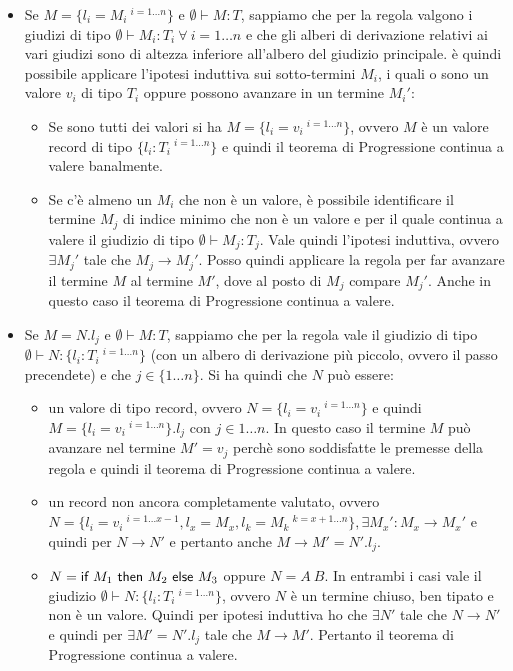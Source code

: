 \begin{itemize}
	\item {} Se $M = \{ l_i = M_i \:^{i = 1 \ldots n} \}$ e $\emptyset \vdash M : T$, sappiamo che per la regola  valgono i giudizi di tipo $\emptyset \vdash M_i : T_i \: \forall \: i = 1\ldots n$ e che gli alberi di derivazione relativi ai vari giudizi sono di altezza inferiore all'albero del giudizio principale.
	\`e quindi possibile applicare l'ipotesi induttiva sui sotto-termini $M_i$, i quali o sono un valore $v_i$ di tipo $T_i$ oppure possono avanzare in un termine $M_i'$:
	\begin{itemize}
		\item Se sono tutti dei valori si ha $M = \{ l_i = v_i \:^{i = 1 \ldots n} \}$, ovvero $M$ \`e un valore record di tipo $\{ l_i : T_i \:^{i = 1 \ldots n} \}$ e quindi il teorema di Progressione continua a valere banalmente.
		\item Se c'\`e almeno un $M_i$ che non \`e un valore, \`e possibile identificare il termine $M_j$ di indice minimo che non \`e un valore e per il quale continua a valere il giudizio di tipo $\emptyset \vdash M_j : T_j$. Vale quindi l'ipotesi induttiva, ovvero $\exists M_j'$ tale che $M_j \to M_j'$. Posso quindi applicare la regola  per far avanzare il termine $M$ al termine $M'$, dove al posto di $M_j$ compare $M_j'$. Anche in questo caso il teorema di Progressione continua a valere.
	\end{itemize}
	\item {} Se $M = N.l_j$ e $\emptyset \vdash M : T$, sappiamo che per la regola  vale il giudizio di tipo $\emptyset \vdash N : \{ l_i : T_i \:^{i = 1 \ldots n}\}$ (con un albero di derivazione pi\`u piccolo, ovvero il passo precendete) e che $j \in \{1 \ldots n\}$.
	Si ha quindi che $N$ pu\`o essere:
	\begin{itemize}
		\item un valore di tipo record, ovvero $N = \{ l_i = v_i \:^{i = 1 \ldots n} \}$ e quindi $M = \{ l_i = v_i \:^{i = 1 \ldots n} \}.l_j$ con $j \in 1 \ldots n$. In questo caso il termine $M$ pu\`o avanzare nel termine $M' = v_j$ perch\`e sono soddisfatte le premesse della regola  e quindi il teorema di Progressione continua a valere.
		
		\item un record non ancora completamente valutato, ovvero $N = \{ l_i = v_i \:^{i = 1 \ldots x-1}, l_x = M_x, l_k = M_k \:^{k = x+1\ldots n}\}, \exists M_x': M_x \to M_x'$ e quindi per  $N \to N'$ e pertanto anche $M \to M' = N'.l_j$.
		
		\item $N = \IF{M_1}{M_2}{M_3}$ oppure $N = A \: B$. In entrambi i casi vale il giudizio $\emptyset \vdash N : \{ l_i : T_i \:^{i = 1 \ldots n}\}$, ovvero $N$ \`e un termine chiuso, ben tipato e non \`e un valore. 
		Quindi per ipotesi induttiva ho che $\exists N'$ tale che $N \to N'$ e quindi per  $\exists M' = N'.l_j$ tale che $M \to M'$.
		Pertanto il teorema di Progressione continua a valere.
	\end{itemize}
\end{itemize}


